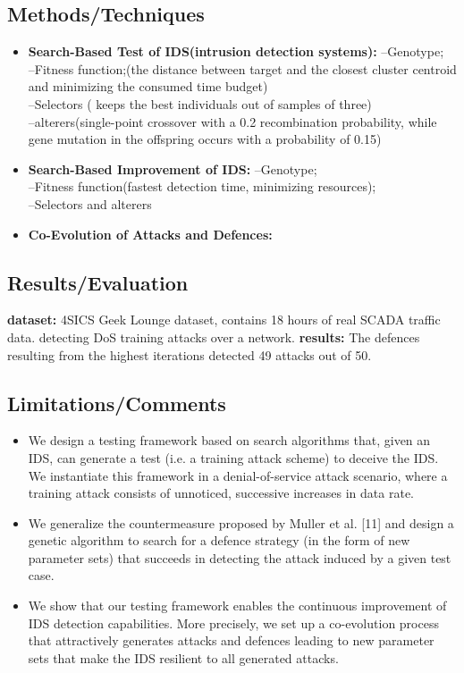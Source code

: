 \subsection{Methods/Techniques}
\begin{itemize}
	\item \textbf{Search-Based Test of IDS(intrusion detection systems):}
          --Genotype;\\
          --Fitness function;(the distance between target and the closest cluster centroid and minimizing the consumed time budget)\\
         --Selectors ( keeps the best individuals out of samples of three)\\
         --alterers(single-point crossover with a 0.2 recombination probability, while gene mutation in the offspring occurs with a probability of 0.15)
    \item \textbf{Search-Based Improvement of IDS:}
          --Genotype;\\
          --Fitness function(fastest detection time, minimizing resources);\\
          --Selectors and alterers
	\item \textbf{Co-Evolution of Attacks and Defences:}	  
\end{itemize}

\subsection{Results/Evaluation}
\textbf{dataset:} 4SICS Geek Lounge dataset, contains 18 hours of real SCADA traffic data. detecting DoS training attacks over a network.
\textbf{results:} The defences resulting from the highest iterations detected 49 attacks out of 50.
\subsection{Limitations/Comments}
\begin{itemize}
	\item We design a testing framework based on search algorithms that, given an IDS, can generate a test (i.e. a training attack scheme) to deceive the IDS. We instantiate this framework in a denial-of-service attack scenario, where a training attack consists of unnoticed, successive increases in data rate. 
	\item We generalize the countermeasure proposed by Muller et al. [11] and design a genetic algorithm to search for a defence strategy (in the form of new parameter sets) that succeeds in detecting the attack induced by a given test case.
	\item We show that our testing framework enables the continuous improvement of IDS detection capabilities. More precisely, we set up a co-evolution process that attractively generates attacks and defences leading to new parameter sets that make the IDS resilient to all generated attacks.
\end{itemize}
\newpage

